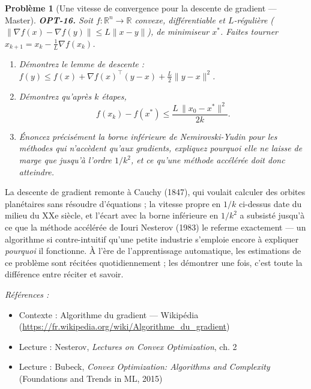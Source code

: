 \documentclass[11pt]{article}
\newtheorem{problem}{Problème}
\newenvironment{refs}{\par\small\noindent\emph{Références :}\begin{itemize}\setlength\itemsep{0pt}}{\end{itemize}\normalsize}
\begin{document}
\bigskip

\begin{problem}[{Une vitesse de convergence pour la descente de gradient --- Master}]
\textbf{OPT-16.} Soit $f : \mathbb{R}^n \to \mathbb{R}$ convexe, différentiable et $L$-régulière ($\|\nabla f(x) - \nabla f(y)\| \le L\|x - y\|$), de minimiseur $x^*$. Faites tourner $x_{k+1} = x_k - \frac{1}{L}\nabla f(x_k)$.
\begin{enumerate}
\item[(a)] Démontrez le lemme de descente : $f(y) \le f(x) + \nabla f(x)^\top (y - x) + \frac{L}{2}\|y - x\|^2$.
\item[(b)] Démontrez qu'après $k$ étapes,
\[ f(x_k) - f(x^*) \le \frac{L\,\|x_0 - x^*\|^2}{2k}. \]
\item[(c)] Énoncez précisément la borne inférieure de Nemirovski-Yudin pour les méthodes qui n'accèdent qu'aux gradients, expliquez pourquoi elle ne laisse de marge que jusqu'à l'ordre $1/k^2$, et ce qu'une méthode \og{} accélérée \fg{} doit donc atteindre.
\end{enumerate}

\end{problem}

\noindent La descente de gradient remonte à Cauchy (1847), qui voulait calculer des orbites planétaires sans résoudre d'équations ; la vitesse propre en $1/k$ ci-dessus date du milieu du XXe siècle, et l'écart avec la borne inférieure en $1/k^2$ a subsisté jusqu'à ce que la méthode accélérée de Iouri Nesterov (1983) le referme exactement --- un algorithme si contre-intuitif qu'une petite industrie s'emploie encore à expliquer \textit{pourquoi} il fonctionne. À l'ère de l'apprentissage automatique, les estimations de ce problème sont récitées quotidiennement ; les démontrer une fois, c'est toute la différence entre réciter et savoir.

\begin{refs}
\item Contexte : Algorithme du gradient --- Wikipédia (\url{https://fr.wikipedia.org/wiki/Algorithme_du_gradient})
\item Lecture : Nesterov, \textit{Lectures on Convex Optimization}, ch. 2
\item Lecture : Bubeck, \textit{Convex Optimization: Algorithms and Complexity} (Foundations and Trends in ML, 2015)
\end{refs}

\bigskip
\end{document}
